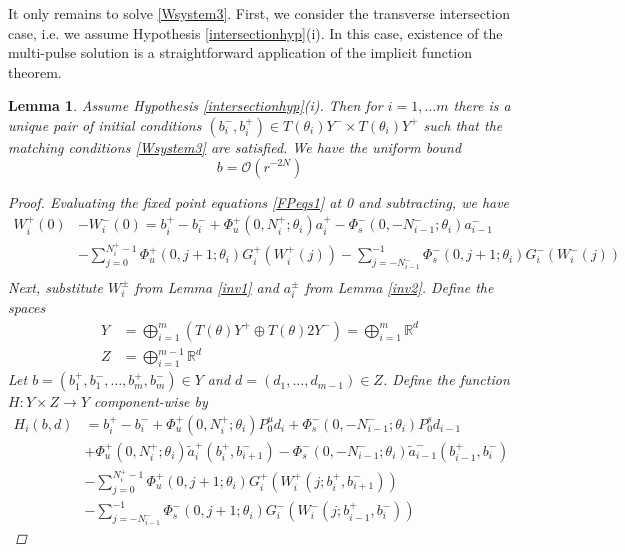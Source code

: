 \documentclass[12pt]{article}
\def\R{{\mathbb R}}
\newtheorem{lemma}{Lemma}
\begin{document}
It only remains to solve \eqref{Wsystem3}. First, we consider the transverse intersection case, i.e. we assume Hypothesis \ref{intersectionhyp}(i). In this case, existence of the multi-pulse solution is a straightforward application of the implicit function theorem.

\begin{lemma}\label{inv3t}
Assume Hypothesis \ref{intersectionhyp}(i). Then for $i = 1, \dots m$ there is a unique pair of initial conditions $(b_i^-, b_i^+) \in T(\theta_i) Y^- \times T(\theta_i) Y^+$ such that the matching conditions \eqref{Wsystem3} are satisfied. We have the uniform bound
\begin{equation}\label{bboundt}
b = \mathcal{O}(r^{-2N})
\end{equation}

\begin{proof}
Evaluating the fixed point equations \eqref{FPeqs1} at 0 and subtracting, we have
\begin{align*}
W_i^+(0) &- W_i^-(0) = b_i^+ - b_i^- 
+ \Phi_u^+(0, N_i^+; \theta_i) a_i^+ - \Phi_s^-(0, -N_{i-1}^-; \theta_i) a_{i-1}^- \\
&- \sum_{j = 0}^{N_i^+-1} \Phi_u^+(0, j+1; \theta_i) G_i^+(W_i^+(j)) 
- \sum_{j = -N_{i-1}^-}^{-1} \Phi_s^-(0, j+1; \theta_i) G_i^-(W_i^-(j)) \\
\end{align*}
Next, substitute $W_i^\pm$ from Lemma \ref{inv1} and $a_i^\pm$ from Lemma \ref{inv2}. Define the spaces
\begin{align}\label{spaceYt}
Y &= \bigoplus_{i=1}^m (T(\theta) Y^+ \oplus T(\theta) 2Y^-) = \bigoplus_{i=1}^m \R^d \\
Z &= \bigoplus_{i=1}^{m-1} \R^d
\end{align}
Let $b = (b_1^+, b_1^-, \dots, b_m^+, b_m^-) \in Y$ and $d = (d_1, \dots, d_{m-1}) \in Z$. Define the function $H: Y \times Z \rightarrow Y$ component-wise by
\begin{align*}
H_i(b, d) &= 
 b_i^+ - b_i^- + \Phi_u^+(0, N_i^+; \theta_i) P_0^u d_i + \Phi_s^-(0, -N_{i-1}^-; \theta_i) P_0^s d_{i-1} \\
&+ \Phi_u^+(0, N_i^+; \theta_i) \tilde{a}_i^+(b_i^+, b_{i+1}^-) 
- \Phi_s^-(0, -N_{i-1}^-; \theta_i) \tilde{a}_{i-1}^-(b_{i-1}^+, b_i^-) \\
&- \sum_{j = 0}^{N_i^+-1} \Phi_u^+(0, j+1; \theta_i) G_i^+(W_i^+(j; b_i^+, b_{i+1}^-)) \\
&- \sum_{j = -N_{i-1}^-}^{-1} \Phi_s^-(0, j+1; \theta_i) G_i^-(W_i^-(j; b_{i-1}^+, b_i^-))
\end{align*}


\end{proof}
\end{lemma}
\end{document}
